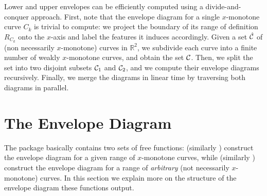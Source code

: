 Lower and upper envelopes can be efficiently computed using a
divide-and-conquer approach. First, note that the envelope diagram for
a single $x$-monotone curve $C_k$ is trivial to compute: we project
the boundary of its range of definition $R_{C_k}$ onto the $x$-axis
and label the features it induces accordingly. Given a set
$\hat{{\cal C}}$ of (non necessarily $x$-monotone) curves in ${\mathbb R}^2$,
we subdivide each curve into a finite number of weakly $x$-monotone 
curves, and obtain the set ${\cal C}$. Then, we split the set into two
disjoint subsets ${\cal C}_1$ and ${\cal C}_2$, and we compute their envelope
diagrams recursively. Finally, we merge the diagrams in linear time by
traversing both diagrams in parallel.

\section{The Envelope Diagram\label{env2_sec:env_diag}}

The package basically contains two sets of free functions:
 (similarly
 ) construct the envelope diagram
for a given range of $x$-monotone curves, while 
 (similarly
) construct the envelope diagram for a
range of {\em arbitrary} (not necessarily $x$-monotone) curves.
In this section we explain more on the structure of the envelope
diagram these functions output.

